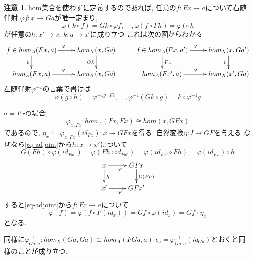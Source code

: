 \documentclass[dvipdfmx,a4paper,11pt]{article}
\theoremstyle{definition}
\newtheorem{rem}[thm]{注意}
\begin{document}
\begin{rem}
hom集合を使わずに定義するのであれば, 
任意の$f : Fx \to a$について右随伴射
$\varphi f : x \to Ga$が唯一定まり, 
\begin{equation}
\label{eq-adjoint}
\varphi(k \circ f) = Gk \circ \varphi f, \quad, \varphi(f \circ Fh) = \varphi f \circ h 
\end{equation}
が任意の$h : x' \to x$, $k : a \to a'$に成り立つ
これは次の図からわかる
\begin{equation*}
\xymatrix@C=25pt@R=20pt{
f \in hom_{A}(Fx, a) \ar@{->}[d] _{k} \ar@{->}[r]^{\varphi}&  
hom_{X}(x, Ga) \ar@{->}[d]_{Gk}   & 
f \in hom_{A}(Fx, a') \ar@{->}[d]^{Fh} \ar@{->}[r]^{\varphi} &
hom_{X}(x, Ga') \ar@{->}[d]_{h} \\
hom_{A}(Fx, a) 	\ar@{->}[r]^{\varphi} 	 &  
hom_{X}(x, Ga)  & 
hom_{A}(Fx', a)	\ar@{->}[r]^{\varphi} &
hom_{X}(x', Ga) \\
}
\end{equation*}
左随伴射$\varphi^{-1}$の言葉で書けば
$$
\varphi(g \circ h) = \varphi^{-1 g \circ Fk}, \quad, 
\varphi^{-1}(Gk \circ g) = k \circ \varphi^{-1}g
$$
\end{rem}

$a=Fx$の場合, 
$$
\varphi_{x,Fx} : hom_{A}(Fx, Fx) \cong hom(x, GFx)
$$
であるので, $\eta_x := \varphi_{x,Fx}(id_{Fx}) : x \to GFx$を得る.
自然変換$\eta : I \to GF$を与える
なぜなら\ref{eq-adjoint}から$h: x \to x'$について
$$
G(Fh) \circ \varphi(id_{Fx'}) 
=
\varphi( Fh \circ id_{Fx'})
=
\varphi(id_{Fx'} \circ Fh)
=
\varphi(id_{Fx}) \circ h
$$
\begin{equation*}
\xymatrix@C=25pt@R=20pt{
x \ar@{->}[d]^{h}\ar@{->}[r]_{\varphi}&
 GFx\ar@{->}[d]^{G(Fh)}\\
x'\ar@{->}[r]_{\varphi}& 
GFx'\\   
}
\end{equation*}
すると\ref{eq-adjoint}から$f : Fx \to a$について
$$
\varphi(f ) = \varphi(f \circ F(id_{x})) = Gf \circ  \varphi(id_x)= Gf \circ \eta_x
$$
となる.

同様に$\varphi^{-1}_{Ga, a} :  hom_{X}(Ga, Ga) \cong hom_{A}(FGa, a)$
$\epsilon_a = \varphi^{-1}_{Ga, a}(id_{Ga})$とおくと同様のことが成り立つ. 
\end{document}
